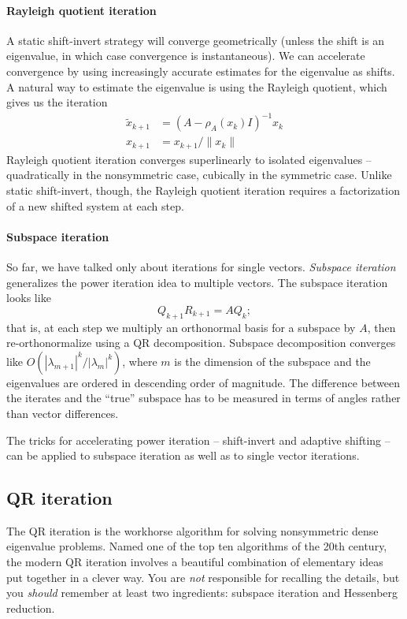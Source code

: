 \documentclass[12pt, leqno]{article}
\begin{document}
\paragraph{Rayleigh quotient iteration}
A static shift-invert strategy will converge geometrically (unless the
shift is an eigenvalue, in which case convergence is instantaneous).
We can accelerate convergence by using increasingly accurate estimates
for the eigenvalue as shifts.  A natural way to estimate the
eigenvalue is using the Rayleigh quotient, which gives us the iteration
\begin{align*}
  \tilde{x}_{k+1} &= (A-\rho_A(x_k) I)^{-1} x_k \\
  x_{k+1} &= x_{k+1}/\|x_k\|
\end{align*}
Rayleigh quotient iteration converges superlinearly to isolated
eigenvalues -- quadratically in the nonsymmetric case, cubically in
the symmetric case.  Unlike static shift-invert, though, the Rayleigh
quotient iteration requires a factorization of a new shifted system
at each step.

\paragraph{Subspace iteration}
So far, we have talked only about iterations for single vectors.
{\em Subspace iteration} generalizes the power iteration idea to
multiple vectors.  The subspace iteration looks like
\[
  Q_{k+1} R_{k+1} = A Q_{k};
\]
that is, at each step we multiply an orthonormal basis for a subspace
by $A$, then re-orthonormalize using a QR decomposition.  Subspace
decomposition converges like $O(|\lambda_{m+1}|^k/|\lambda_{m}|^k)$,
where $m$ is the dimension of the subspace and the eigenvalues are
ordered in descending order of magnitude.  The difference between the
iterates and the ``true'' subspace has to be measured in terms of
angles rather than vector differences.

The tricks for accelerating power iteration -- shift-invert
and adaptive shifting -- can be applied to subspace iteration as
well as to single vector iterations.

\subsection{QR iteration}

The QR iteration is the workhorse algorithm for solving nonsymmetric
dense eigenvalue problems.  Named one of the top ten algorithms of the
20th century, the modern QR iteration involves a beautiful combination
of elementary ideas put together in a clever way.  You are {\em not}
responsible for recalling the details, but you {\em should} remember
at least two ingredients: subspace iteration and Hessenberg reduction.
\end{document}
